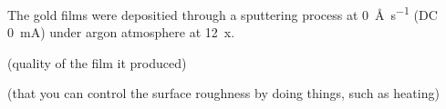 The gold films were depositied through a sputtering process at
\SI{0}{\angstrom\per\second} (DC \SI{0}{\milli\ampere}) under argon
atmosphere at \SI{12}{x}.

(quality of the film it produced)

(that you can control the surface roughness by doing things, such as
heating)


